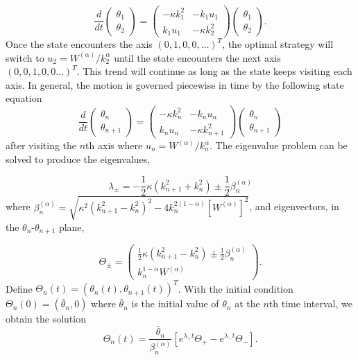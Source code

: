 \[
	\frac{d}{dt}\left( \begin{array}{c}
	\theta_{1} \\
	\theta_{2}\end{array} \right)
	=
	\left( \begin{array}{cc}
	-\kappa k_{1}^2 & -k_{1}u_{1} \\
	k_{1}u_{1} & -\kappa k_{2}^2  \end{array} \right)
	\left( \begin{array}{c}
	\theta_{1} \\
	\theta_{2}\end{array} \right).
\]
Once the state encounters the axis $(0,1,0,0, \dots)^{T}$, the optimal strategy will switch to $u_{2}= W^{(\alpha)}/k_{2}^{\alpha}$ until the state encounters the next axis $(0,0,1,0,0 \dots)^{T}$. This trend will continue as long as the state keeps visiting each axis. In general, the motion is governed piecewise in time by the following state equation
\begin{equation}
	\frac{d}{dt}\left( \begin{array}{c}
	\theta_{n} \\
	\theta_{n+1}\end{array} \right)
	=
	\left( \begin{array}{cc}
	-\kappa k_{n}^2 & -k_{n}u_{n} \\
	k_{n}u_{n} & -\kappa k_{n+1}^2  \end{array} \right)
	\left( \begin{array}{c}
	\theta_{n} \\
	\theta_{n+1}\end{array} \right)
\end{equation}
after visiting the $n$th axis where $u_{n}=W^{(\alpha)}/k_{n}^{\alpha}$. The eigenvalue problem can be solved to produce the eigenvalues,

\begin{equation}
\label{eq:eigenvalues_lit}
	\lambda_{\pm}=-\frac{1}{2} \kappa(k_{n+1}^2 + k_n^2) \pm \frac{1}{2}\beta_{n}^{(\alpha)}
\end{equation}
where $\beta_{n}^{(\alpha)}=\sqrt{\kappa^{2}(k_{n+1}^2 - k_n^2)^2 - 4 k_n^{2(1-\alpha)} [W^{(\alpha)}]^2 }$, and eigenvectors, in the $\theta_{n}$-$\theta_{n+1}$ plane,

\begin{equation}
	\Theta_{\pm} = \left(
	\begin{array}{c}
		\frac{1}{2} \kappa(k_{n+1}^2 - k_n^2) \pm \frac{1}{2} \beta_{n}^{(\alpha)}\\
		k_n^{1-\alpha}W^{(\alpha)}
	\end{array}
	\right).
\end{equation}
Define $\Theta_n (t)= (\theta_n(t) , \theta_{n+1}(t) )^{T}$. With the initial condition $\Theta_n (0) = (\bar{\theta}_{n}, 0)$ where $\bar{\theta}_{n}$ is the initial value of $\theta_{n}$ at the $n$th time interval, we obtain the solution
\begin{equation}
	\Theta_{n}(t)= \frac{\bar{\theta}_{n}}{\beta_{n}^{(\alpha)}} \left[e^{\lambda_{+}t}\Theta_{+}- e^{\lambda_{-}t}\Theta_{-} \right].
\end{equation}

